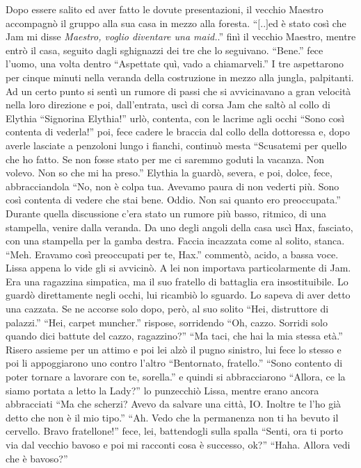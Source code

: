    Dopo essere salito ed aver fatto le dovute presentazioni, il vecchio
    Maestro accompagnò il gruppo alla sua casa in mezzo alla foresta.
    ``$[$..$]$ed è stato così che Jam mi disse \emph{Maestro, voglio
    diventare una maid.}.'' finì il vecchio Maestro, mentre entrò il casa,
    seguito dagli sghignazzi dei tre che lo seguivano. ``Bene.'' fece
    l'uomo, una volta dentro ``Aspettate quì, vado a chiamarveli.'' I tre
    aspettarono per cinque minuti nella veranda della costruzione in mezzo
    alla jungla, palpitanti. Ad un certo punto si sentì un rumore di passi
    che si avvicinavano a gran velocità nella loro direzione e poi,
    dall'entrata, uscì di corsa Jam che saltò al collo di Elythia
    ``Signorina Elythia!'' urlò, contenta, con le lacrime agli occhi ``Sono
    così contenta di vederla!'' poi, fece cadere le braccia dal collo della
    dottoressa e, dopo averle lasciate a penzoloni lungo i fianchi,
    continuò mesta ``Scusatemi per quello che ho fatto. Se non fosse stato
    per me ci saremmo goduti la vacanza. Non volevo. Non so che mi ha
    preso.'' Elythia la guardò, severa, e poi, dolce, fece, abbracciandola ``No, non è
    colpa tua. Avevamo paura di non vederti più. Sono così contenta di
    vedere che stai bene. Oddio. Non sai quanto ero preoccupata.'' Durante
    quella discussione c'era stato un rumore più basso, ritmico, di una
    stampella, venire dalla veranda. Da uno degli angoli della casa uscì
    Hax, fasciato, con una stampella per la gamba destra. Faccia incazzata
    come al solito, stanca. ``Meh. Eravamo così preoccupati per te, Hax.''
    commentò, acido, a bassa voce. Lissa appena lo vide gli si avvicinò. A
    lei non importava particolarmente di Jam. Era una ragazzina simpatica,
    ma il suo fratello di battaglia era insostituibile. Lo guardò
    direttamente negli occhi, lui ricambiò lo sguardo. Lo sapeva di aver
    detto una cazzata. Se ne accorse solo dopo, però, al suo solito ``Hei,
    distruttore di palazzi.'' ``Hei, carpet muncher.'' rispose, sorridendo
    ``Oh, cazzo. Sorridi solo quando dici battute del cazzo, ragazzino?''
    ``Ma taci, che hai la mia stessa età.'' Risero assieme per un attimo e
    poi lei alzò il pugno sinistro, lui fece lo stesso e poi li
    appoggiarono uno contro l'altro ``Bentornato, fratello.'' ``Sono
    contento di poter tornare a lavorare con te, sorella.'' e quindi si
    abbracciarono ``Allora, ce la siamo portata a letto la Lady?'' lo
    punzecchiò Lissa, mentre erano ancora abbracciati ``Ma che scherzi?
    Avevo da salvare una città, IO. Inoltre te l'ho già detto che non è il
    mio tipo.'' ``Ah. Vedo che la permanenza non ti ha bevuto il cervello.
    Bravo fratellone!'' fece, lei, battendogli sulla spalla ``Senti, ora ti
    porto via dal vecchio bavoso e poi mi racconti cosa è successo, ok?''
    ``Haha. Allora vedi che è bavoso?''

